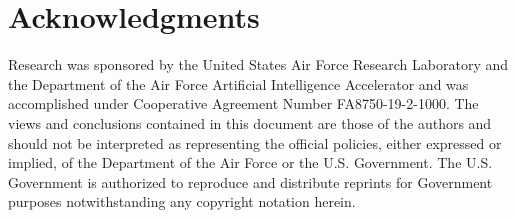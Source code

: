 \documentclass[letterpaper]{article} %
\begin{document}
\section*{Acknowledgments}

Research was sponsored by the United States Air Force Research Laboratory and the Department of the Air Force Artificial Intelligence Accelerator and was accomplished under Cooperative Agreement Number FA8750-19-2-1000. The views and conclusions contained in this document are those of the authors and should not be interpreted as representing the official policies, either expressed or implied, of the Department of the Air Force or the U.S. Government. The U.S. Government is authorized to reproduce and distribute reprints for Government purposes notwithstanding any copyright notation herein.




\end{document}
